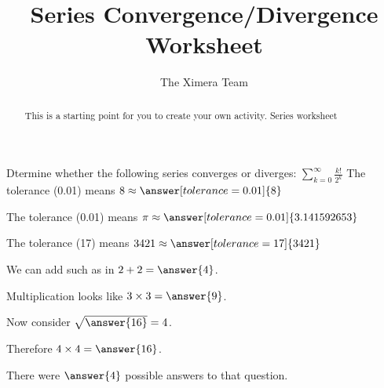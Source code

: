 \documentclass{ximera}
\title{Series Convergence/Divergence Worksheet}
\author{The Ximera Team}
\begin{document}
\begin{abstract}
This is a starting point for you to create your own activity.   Series worksheet
\end{abstract}

\maketitle

\begin{problem}
Dtermine whether the following series converges or diverges:
$\sum_{k=0}^\infty \frac{k!}{2^k}$
   The tolerance (0.01) means $8 \approx \answer[tolerance=0.01]{8}$
\end{problem}

 \begin{problem}
   The tolerance (0.01) means $\pi \approx \answer[tolerance=0.01]{3.141592653}$
 \end{problem}

 \begin{problem}
   The tolerance (17) means $3421 \approx \answer[tolerance=17]{3421}$
 \end{problem}


 \begin{problem}
   We can add such as in $2 + 2 = \answer{4}$.
   \begin{problem}
     Multiplication looks like $3 \times 3 = \answer{9}$.
     \begin{problem}
       Now consider $\sqrt{\answer{16}} = 4$.
       \begin{problem}
         Therefore $4 \times 4 = \answer{16}$.
       \end{problem}
     \end{problem}
   \end{problem}
   \end{problem}

\begin{problem}
  \begin{multipleChoice}
   \end{multipleChoice}

   \begin{problem}
     There were $\answer{4}$ possible answers to that question.

     \begin{problem}
       \begin{multipleChoice}
       \end{multipleChoice}
     \end{problem}
   \end{problem}
\end{problem}
\end{document}
